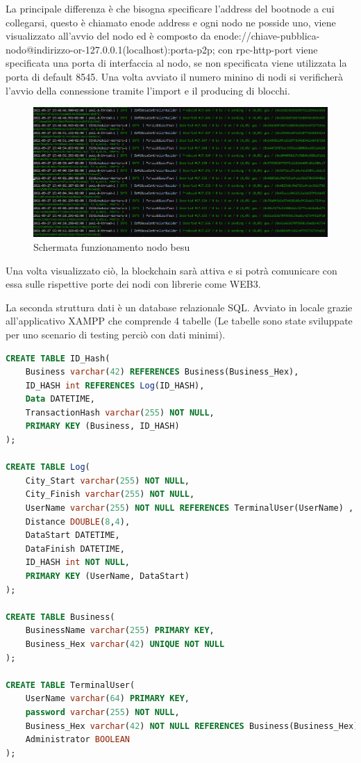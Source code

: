\documentclass[11pt,a4paper,titlepage,twoside,openright]{report}
\begin{document}
La principale differenza è che bisogna specificare l'address del bootnode a cui collegarsi, questo è chiamato enode address e ogni nodo ne posside uno, viene visualizzato all'avvio del nodo ed è composto da 
enode://chiave-pubblica-nodo@indirizzo-or-127.0.0.1(localhost):porta-p2p; con rpc-http-port viene specificata una porta di interfaccia al nodo, se non specificata viene utilizzata la porta di default 8545. Una volta avviato il numero minino di nodi si verificherà l'avvio della connessione tramite l'import e il producing di blocchi.
\begin{figure}[h]
	\includegraphics[width=\textwidth]{Besu-imported-produced}
	\centering
	\caption{Schermata funzionamento nodo besu}
	\label{fig:besu-imported-produced}
\end{figure}
Una volta visualizzato ciò, la blockchain sarà attiva e si potrà comunicare con essa sulle rispettive porte dei nodi con librerie come WEB3.

La seconda struttura dati è un database relazionale SQL. Avviato in locale grazie all'applicativo XAMPP che comprende 4 tabelle (Le tabelle sono state sviluppate per uno scenario di testing perciò con dati minimi).
\begin{lstlisting}[language=SQL]
CREATE TABLE ID_Hash(
	Business varchar(42) REFERENCES Business(Business_Hex),
	ID_HASH int REFERENCES Log(ID_HASH),
	Data DATETIME,
	TransactionHash varchar(255) NOT NULL,
	PRIMARY KEY (Business, ID_HASH)
);

CREATE TABLE Log(
	City_Start varchar(255) NOT NULL,
	City_Finish varchar(255) NOT NULL,
	UserName varchar(255) NOT NULL REFERENCES TerminalUser(UserName) ,
	Distance DOUBLE(8,4),
	DataStart DATETIME,
	DataFinish DATETIME,
	ID_HASH int NOT NULL,
	PRIMARY KEY (UserName, DataStart)
);

CREATE TABLE Business(
	BusinessName varchar(255) PRIMARY KEY,
	Business_Hex varchar(42) UNIQUE NOT NULL
);

CREATE TABLE TerminalUser(
	UserName varchar(64) PRIMARY KEY,
	password varchar(255) NOT NULL,
	Business_Hex varchar(42) NOT NULL REFERENCES Business(Business_Hex),
	Administrator BOOLEAN
);
\end{lstlisting}
\end{document}
